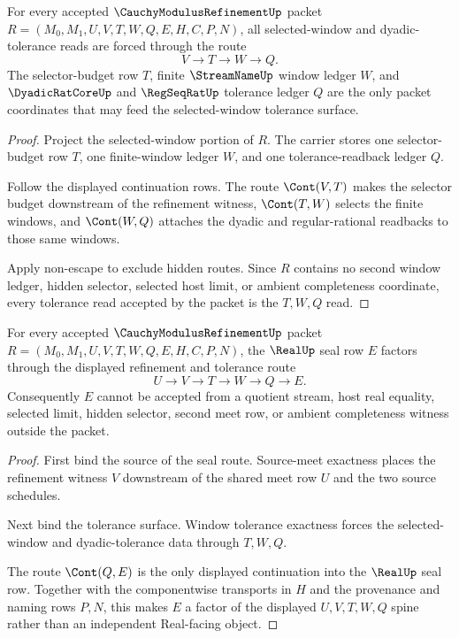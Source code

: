 \begin{theorem}
\label{thm:cauchy-modulus-refinement-window-tolerance-exactness}
For every accepted $\CauchyModulusRefinementUp$ packet $R=(M_0,M_1,U,V,T,W,Q,E,H,C,P,N)$, all selected-window and dyadic-tolerance reads are forced through the route
$$
V \longrightarrow T \longrightarrow W \longrightarrow Q.
$$
The selector-budget row $T$, finite $\StreamNameUp$ window ledger $W$, and $\DyadicRatCoreUp$ and $\RegSeqRatUp$ tolerance ledger $Q$ are the only packet coordinates that may feed the selected-window tolerance surface.
\end{theorem}
\begin{proof}
Project the selected-window portion of $R$. The carrier stores one selector-budget row $T$, one finite-window ledger $W$, and one tolerance-readback ledger $Q$.

Follow the displayed continuation rows. The route $\Cont(V,T)$ makes the selector budget downstream of the refinement witness, $\Cont(T,W)$ selects the finite windows, and $\Cont(W,Q)$ attaches the dyadic and regular-rational readbacks to those same windows.

Apply non-escape to exclude hidden routes. Since $R$ contains no second window ledger, hidden selector, selected host limit, or ambient completeness coordinate, every tolerance read accepted by the packet is the $T,W,Q$ read.
\end{proof}

\begin{theorem}
\label{thm:cauchy-modulus-refinement-real-seal-factorization}
For every accepted $\CauchyModulusRefinementUp$ packet $R=(M_0,M_1,U,V,T,W,Q,E,H,C,P,N)$, the $\RealUp$ seal row $E$ factors through the displayed refinement and tolerance route
$$
U \longrightarrow V \longrightarrow T \longrightarrow W \longrightarrow Q \longrightarrow E.
$$
Consequently $E$ cannot be accepted from a quotient stream, host real equality, selected limit, hidden selector, second meet row, or ambient completeness witness outside the packet.
\end{theorem}
\begin{proof}
First bind the source of the seal route. Source-meet exactness places the refinement witness $V$ downstream of the shared meet row $U$ and the two source schedules.

Next bind the tolerance surface. Window tolerance exactness forces the selected-window and dyadic-tolerance data through $T,W,Q$.

The route $\Cont(Q,E)$ is the only displayed continuation into the $\RealUp$ seal row. Together with the componentwise transports in $H$ and the provenance and naming rows $P,N$, this makes $E$ a factor of the displayed $U,V,T,W,Q$ spine rather than an independent Real-facing object.
\end{proof}


